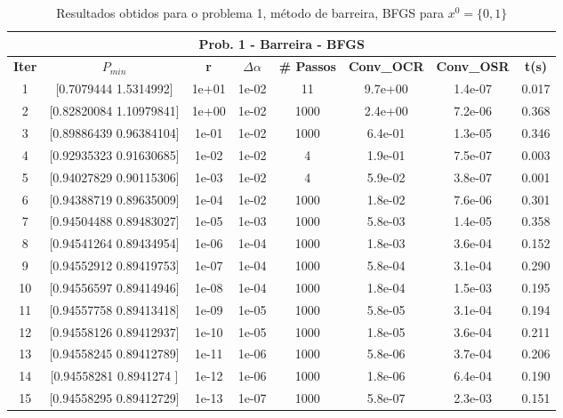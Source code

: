 \documentclass[10pt, a4paper]{article}
\begin{document}
\vspace{5mm}
\begin{table}[H]
  \begin{center}
    \begin{tabular}{c|c|c|c|c|c|c|c}
      \multicolumn{8}{c}{\textbf{Prob. 1 - Barreira - BFGS}}\\
      \hline
      \textbf{Iter} & \textbf{$P_{min}$} & \textbf{r} & $\Delta \alpha$ &\textbf{\# Passos} & \textbf{Conv\_OCR} & \textbf{Conv\_OSR} & \textbf{t(s)}\\
      \hline
        1& [0.7079444 1.5314992]& 1e+01& 1e-02 &11& 9.7e+00& 1.4e-07& 0.017           \\
        2& [0.82820084 1.10979841]& 1e+00& 1e-02 &1000& 2.4e+00& 7.2e-06& 0.368\\
        3& [0.89886439 0.96384104]& 1e-01& 1e-02 &1000& 6.4e-01& 1.3e-05& 0.346\\
        4& [0.92935323 0.91630685]& 1e-02& 1e-02 &4& 1.9e-01& 7.5e-07& 0.003\\
        5& [0.94027829 0.90115306]& 1e-03& 1e-02 &4& 5.9e-02& 3.8e-07& 0.001\\
        6& [0.94388719 0.89635009]& 1e-04& 1e-02 &1000& 1.8e-02& 7.6e-06& 0.301\\
        7& [0.94504488 0.89483027]& 1e-05& 1e-03 &1000& 5.8e-03& 1.4e-05& 0.358\\
        8& [0.94541264 0.89434954]& 1e-06& 1e-04 &1000& 1.8e-03& 3.6e-04& 0.152\\
        9& [0.94552912 0.89419753]& 1e-07& 1e-04 &1000& 5.8e-04& 3.1e-04& 0.290\\
        10& [0.94556597 0.89414946]& 1e-08& 1e-04 &1000& 1.8e-04& 1.5e-03& 0.195\\
        11& [0.94557758 0.89413418]& 1e-09& 1e-05 &1000& 5.8e-05& 3.1e-04& 0.194\\
        12& [0.94558126 0.89412937]& 1e-10& 1e-05 &1000& 1.8e-05& 3.6e-04& 0.211\\
        13& [0.94558245 0.89412789]& 1e-11& 1e-06 &1000& 5.8e-06& 3.7e-04& 0.206\\
        14& [0.94558281 0.8941274 ]& 1e-12& 1e-06 &1000& 1.8e-06& 6.4e-04& 0.190\\
        15& [0.94558295 0.89412729]& 1e-13& 1e-07 &1000& 5.8e-07& 2.3e-03& 0.151\\
    \end{tabular}
  \end{center}
  \caption{Resultados obtidos para o problema 1, método de barreira, BFGS para $x^0=\{0,1\}$}
\end{table}
\end{document}
